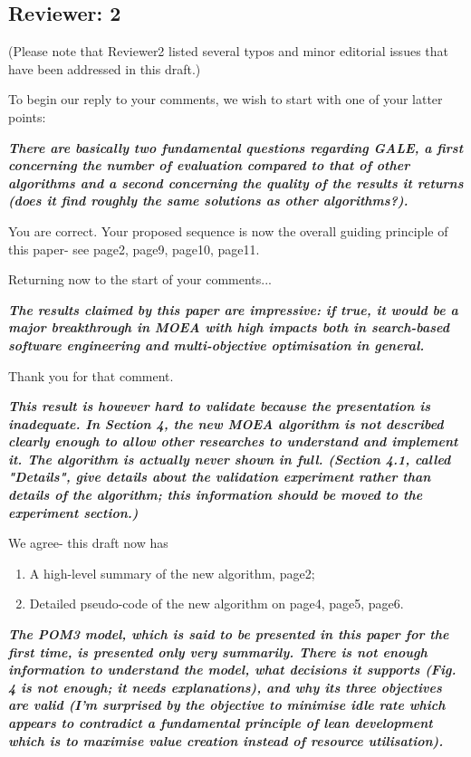 \documentclass[10pt,journal,compsoc]{IEEEtran}
\newcommand{\be}{\begin{enumerate}}
\newcommand{\ee}{\end{enumerate}}
\begin{document}
\subsection*{Reviewer: 2}

(Please note that Reviewer2 listed several typos and minor editorial issues
that have been addressed in this draft.)

To begin our reply to your comments, we wish to start with one of your latter points:

{\bf {\em There are basically two fundamental questions regarding GALE, a first concerning the number of evaluation compared to that of other algorithms and a second concerning the quality of the results it returns (does it find roughly the same solutions as other algorithms?).}}

You are correct. Your proposed sequence is now the overall guiding
principle of this paper- see page2, page9, page10, page11.

Returning now to the start of your comments...

{\bf {\em The results claimed by this paper are
    impressive: if true, it would be a major
    breakthrough in MOEA with high impacts both in
    search-based software engineering and
    multi-objective optimisation in general. }}

Thank you for that comment.

{\bf {\em This result is however hard to validate because the presentation is inadequate.
In Section 4, the new MOEA algorithm is not described clearly enough to allow
other researches to understand and implement it. The algorithm is actually never
shown in full. (Section 4.1, called "Details", give details about the validation
experiment rather than details of the algorithm; this information should be moved
to the experiment section.)}}

We agree- this draft  now has 
\be
\item A high-level summary of the new algorithm, page2;
\item Detailed pseudo-code of the new algorithm on page4, page5, page6.
\ee

{\bf {\em
The POM3 model, which is said to be presented in this paper for the first time, is 
presented only very summarily. There is not enough information to understand the model, 
what decisions it supports (Fig. 4 is not enough; it needs explanations), and why its 
three objectives are valid (I'm surprised by the objective to minimise idle rate which 
appears to contradict a fundamental principle of lean development which is to maximise 
value creation instead of resource utilisation).}}
\end{document}
